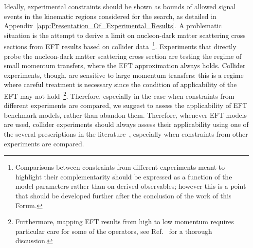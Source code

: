 Ideally, experimental constraints should be shown as bounds of allowed signal events in the kinematic regions considered for 
the search, as detailed in Appendix~\ref{app:Presentation_Of_Experimental_Results}. 
A problematic situation is the attempt to derive a limit on
nucleon-dark matter scattering cross sections from EFT results
based on collider data~\footnote{Comparisons between constraints from different experiments 
	meant to highlight their complementarity should be expressed as 
	a function of the model parameters rather than on derived observables;
	however this is a point that should be developed further after the conclusion of the work of this Forum.}. 
Experiments that directly probe the nucleon-dark matter scattering cross section 
are testing the regime of small momentum transfers, where the EFT approximation always holds.  
Collider experiments, though, are sensitive to large momentum transfers: this is a regime where careful 
treatment is necessary since the condition of applicability of the EFT may not hold~\footnote{
Furthermore, mapping EFT results from high to low momentum requires particular care for some of the operators, 
see Ref.~\cite{D'Eramo:2014aba} for a thorough discussion.}.
Therefore, especially in the case when constraints from different experiments are compared, 
we suggest to assess the applicability of EFT benchmark models, rather than abandon them.
Therefore, whenever EFT models are used, collider experiments should always assess their applicability 
using one 
of the several prescriptions in the literature~\cite{Busoni:2013lha,Busoni:2014sya,Busoni:2014haa,Aad:2015zva,Racco:2015dxa}, 
especially when constraints from other experiments are compared.

